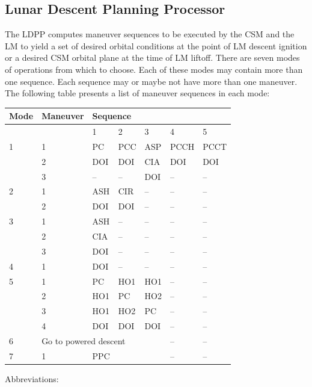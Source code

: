 \documentclass[11pt]{article} %
\begin{document}
\subsection{Lunar Descent Planning Processor}
The LDPP computes maneuver sequences to be executed by the CSM and the LM to yield a set of desired orbital conditions at the point of LM descent ignition or a desired CSM orbital plane at the time of LM liftoff. There are seven modes of operations from which to choose. Each of these modes may contain more than one sequence. Each sequence may or maybe not have more than one maneuver. The following table presents a list of maneuver sequences in each mode:\\

\begin{center}
\begin{tabular}{|l|l|l|l|l|l|l|}
\hline
Mode&Maneuver&\multicolumn{5}{|l|}{Sequence}\\
\hline
&&1&2&3&4&5\\
\hline
1&1&PC&PCC&ASP&PCCH&PCCT\\
&2&DOI&DOI&CIA&DOI&DOI\\
&3&--&--&DOI&--&--\\
\hline
2&1&ASH&CIR&--&--&--\\
&2&DOI&DOI&--&--&--\\
\hline
3&1&ASH&--&--&--&--\\
&2&CIA&--&--&--&--\\
&3&DOI&--&--&--&--\\
\hline
4&1&DOI&--&--&--&--\\
\hline
5&1&PC&HO1&HO1&--&--\\
&2&HO1&PC&HO2&--&--\\
&3&HO1&HO2&PC&--&--\\
&4&DOI&DOI&DOI&--&--\\
\hline
6&\multicolumn{4}{|l|}{Go to powered descent}&--&--\\
\hline
7&1&PPC&&&--&--\\
\hline
\end{tabular}
\end{center}

Abbreviations:\\
\end{document}
